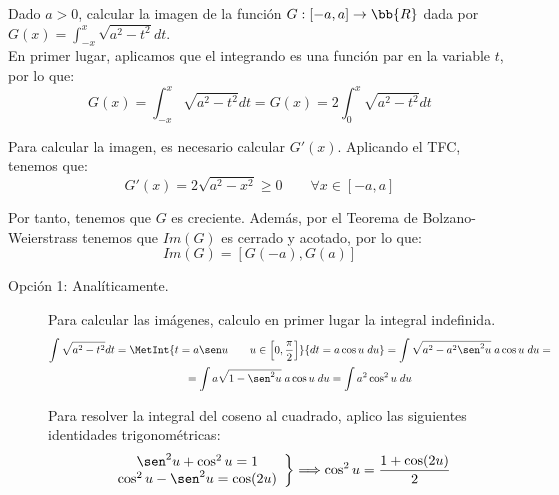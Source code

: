 \begin{ejercicio}
    Dado $a>0$, calcular la imagen de la función $G:[-a,a]\to\bb{R}$ dada por $G(x) = \int_{-x}^x \sqrt{a^2-t^2}dt$.\\

    En primer lugar, aplicamos que el integrando es una función par en la variable $t$, por lo que:
    \begin{equation*}
        G(x) = \int_{-x}^x \sqrt{a^2-t^2}dt = G(x) = 2\int_{0}^x \sqrt{a^2-t^2}dt
    \end{equation*}

    Para calcular la imagen, es necesario calcular $G'(x)$. Aplicando el TFC, tenemos que:
    \begin{equation*}
        G'(x)=2\sqrt{a^2-x^2} \geq 0 \qquad \forall x\in [-a, a]
    \end{equation*}

    Por tanto, tenemos que $G$ es creciente. Además, por el Teorema de Bolzano-Weierstrass tenemos que $Im(G)$ es cerrado y acotado, por lo que:
    \begin{equation*}
        Im(G)=[G(-a), G(a)]
    \end{equation*}
    
    \begin{description}
        \item [Opción 1: Analíticamente.]
        
        Para calcular las imágenes, calculo en primer lugar la integral indefinida.
        \begin{multline*}
            \int \sqrt{a^2-t^2}dt = \MetInt{t=a\sen u \qquad u\in \left[0,\frac{\pi}{2}\right]}{dt = a\cos u\;du} = \int \sqrt{a^2-a^2\sen^2 u}\;a\cos u\;du
            =\\=\int a\sqrt{1-\sen^2 u}\;a\cos u\;du
            =\int a^2\cos^2 u\;du
        \end{multline*}
    
        Para resolver la integral del coseno al cuadrado, aplico las siguientes identidades trigonométricas:
        \begin{equation*}
            \left.\begin{array}{c}
                \sen^2 u + \cos^2 u =1 \\
                \cos^2 u - \sen^2 u = \cos(2u) 
            \end{array}\right\} \Longrightarrow
            \cos^2 u = \frac{1+\cos(2u)}{2}
        \end{equation*}
    

\end{description}
\end{ejercicio}
